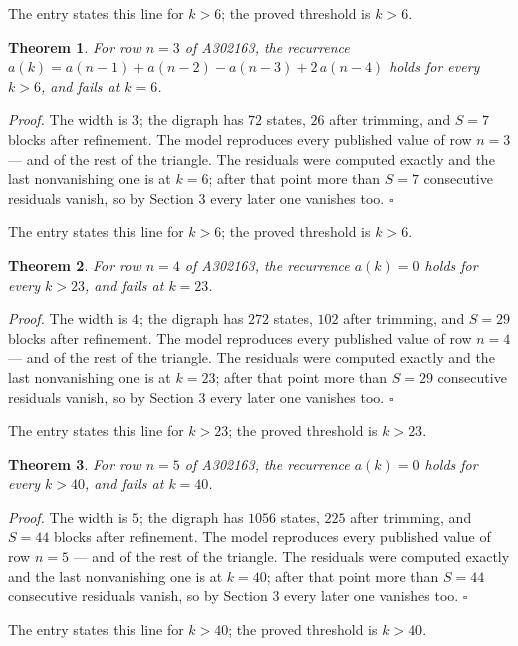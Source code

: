 \documentclass[11pt]{article}
\newtheorem{theorem}{Theorem}
\theoremstyle{definition}
\begin{document}
The entry states this line for $k > 6$; the proved threshold is $k > 6$.

\begin{theorem} For row $n = 3$ of A302163, the recurrence $a(k) = a(n-1) + a(n-2) - a(n-3) + 2\,a(n-4)$ holds for every $k > 6$, and fails at $k = 6$.\end{theorem}

{\itshape Proof.} The width is $3$; the digraph has $72$ states, $26$ after trimming, and $S = 7$ blocks after refinement. The model reproduces every published value of row $n = 3$ --- and of the rest of the triangle. The residuals were computed exactly and the last nonvanishing one is at $k = 6$; after that point more than $S = 7$ consecutive residuals vanish, so by Section 3 every later one vanishes too. $\square$

The entry states this line for $k > 6$; the proved threshold is $k > 6$.

\begin{theorem} For row $n = 4$ of A302163, the recurrence $a(k) = 0$ holds for every $k > 23$, and fails at $k = 23$.\end{theorem}

{\itshape Proof.} The width is $4$; the digraph has $272$ states, $102$ after trimming, and $S = 29$ blocks after refinement. The model reproduces every published value of row $n = 4$ --- and of the rest of the triangle. The residuals were computed exactly and the last nonvanishing one is at $k = 23$; after that point more than $S = 29$ consecutive residuals vanish, so by Section 3 every later one vanishes too. $\square$

The entry states this line for $k > 23$; the proved threshold is $k > 23$.

\begin{theorem} For row $n = 5$ of A302163, the recurrence $a(k) = 0$ holds for every $k > 40$, and fails at $k = 40$.\end{theorem}

{\itshape Proof.} The width is $5$; the digraph has $1056$ states, $225$ after trimming, and $S = 44$ blocks after refinement. The model reproduces every published value of row $n = 5$ --- and of the rest of the triangle. The residuals were computed exactly and the last nonvanishing one is at $k = 40$; after that point more than $S = 44$ consecutive residuals vanish, so by Section 3 every later one vanishes too. $\square$

The entry states this line for $k > 40$; the proved threshold is $k > 40$.
\end{document}
